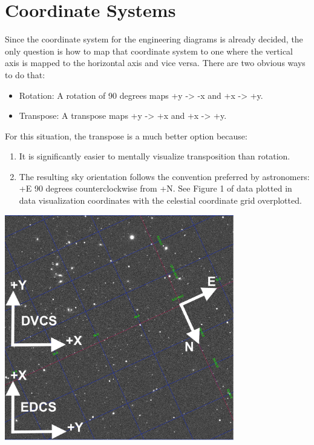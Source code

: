 \section{Coordinate Systems}
Since the coordinate system for the engineering diagrams is already decided, the only question is how to map that coordinate system to one where the vertical axis is mapped to the horizontal axis and vice versa. There are two obvious ways to do that:

\begin{itemize}
\item Rotation: A rotation of 90 degrees maps +y -> -x and +x -> +y.
\item Transpose: A transpose maps +y -> +x and +x -> +y.
\end{itemize}

For this situation, the transpose is a much better option because:

\begin{enumerate}
\item It is significantly easier to mentally visualize transposition than rotation.
\item The resulting sky orientation follows the convention preferred by astronomers: +E 90 degrees counterclockwise from +N.  See Figure 1 of data plotted in data visualization coordinates with the celestial coordinate grid overplotted.
\end{enumerate}

\begin{center}
\includegraphics[width=0.75\textwidth]{figures/ds9_coords_with_arrows.png}
\end{center}

